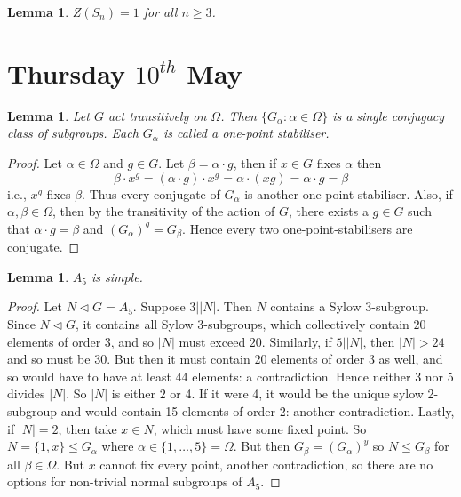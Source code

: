 \documentclass[a4paper,10pt]{article}
\newtheorem{Lem}[thm]{Lemma}
\begin{document}
\begin{Lem}
$Z(S_n) = 1$ for all $n \geq 3$.
\end{Lem}


\newpage
\section{Thursday $10^{th}$ May}


\begin{Lem}
Let $G$ act transitively on $\Omega$. Then $\{ G_\alpha : \alpha \in \Omega \}$ is a single conjugacy class of subgroups. Each $G_\alpha$ is called a one-point stabiliser. 
\end{Lem}

\begin{proof}
Let $\alpha \in \Omega$ and $g \in G$. Let $\beta = \alpha \cdot g$, then if $x \in G$ fixes $\alpha$ then
\[ \beta \cdot x^g = (\alpha \cdot g) \cdot x^g = \alpha \cdot (xg) = \alpha \cdot g = \beta\]
i.e., $x^g$ fixes $\beta$. Thus every conjugate of $G_\alpha$ is another one-point-stabiliser. Also, if $\alpha, \beta \in \Omega$, then by the transitivity of the action of $G$, there exists a $g \in G$ such that $\alpha \cdot g = \beta$ and $(G_\alpha )^g = G_\beta$. Hence every two one-point-stabilisers are conjugate. 
\end{proof}

\begin{Lem}
$A_5$ is simple.
\end{Lem}


\begin{proof}
Let $N \triangleleft G = A_5$. Suppose $3\big| |N|$. Then $N$ contains a Sylow $3$-subgroup. Since $N \triangleleft G$, it contains all Sylow $3$-subgroups, which collectively contain $20$ elements of order 3, and so $|N|$ must exceed $20$. Similarly, if $5 \big| |N|$, then $|N| > 24$ and so must be $30$. But then it must contain 20 elements of order 3 as well, and so would have to have at least 44 elements: a contradiction. Hence neither 3 nor 5 divides $|N|$. So $|N|$ is either $2$ or 4. If it were 4, it would be the unique sylow 2-subgroup and would contain 15 elements of order 2: another contradiction. Lastly, if $|N| = 2$, then take $x \in N$, which must have some fixed point. So $N = \{ 1 , x\} \leq G_\alpha$ where $\alpha \in \{1, \dots, 5\} = \Omega$. But then $G_\beta = (G_\alpha)^y$ so $N \leq G_\beta$ for all $\beta \in \Omega$. But $x$ cannot fix every point, another contradiction, so there are no options for non-trivial normal subgroups of $A_5$.
\end{proof}
\end{document}
